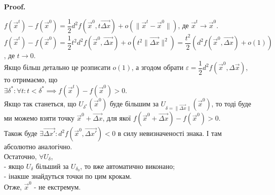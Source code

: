 \documentclass[a4paper, 10pt]{article}
\makeatletter
\def\qed{$\blacksquare$}
\theoremstyle{theoremdd}
\theoremstyle{theoremdd}
\theoremstyle{theoremdd}
\theoremstyle{theoremdd}
\theoremstyle{theoremdd}
\theoremstyle{theoremdd}
\theoremstyle{theoremdd}
\theoremstyle{theoremdd}
\theoremstyle{theoremdd}
\renewenvironment{proof}[1][Proof.\\]{\par
\pushQED{\hfill \qed}%
\normalfont \topsep6\p@\@plus6\p@\relax
\trivlist
\item\relax
{\bfseries
#1\@addpunct{.}}\hspace\labelsep\ignorespaces
}{%
\popQED\endtrivlist\@endpefalse
}
\newcommand\Norm[1]{\lVert#1\rVert}
\makeatother
\begin{document}
\begin{proof}
$f(\vec{x}^t) - f(\vec{x}^0) = \dfrac{1}{2} d^2f (\vec{x}^0, t \vec{\Delta x}) + o(\Norm{\vec{x}^t - \vec{x}^0})$, де $\vec{x}^t \to \vec{x}^0$.\\
$f(\vec{x}^t) - f(\vec{x}^0) = \dfrac{1}{2} t^2 d^2 f(\vec{x}^0, \vec{\Delta x}) + o(t^2 \Norm{\vec{\Delta x}}^2) = \dfrac{t^2}{2} \left(d^2 f(\vec{x}^0, \vec{\Delta x}) + o(1) \right)$, де $t \to 0$.\\
Якщо більш детально це розписати $o(1)$, а згодом обрати $\varepsilon = \dfrac{1}{2}d^2f(\vec{x}^0,\Delta \vec{x})$, то отримаємо, що\\
$\exists \delta^*: \forall t: t < \delta^* \implies f(\vec{x}^t) - f(\vec{x}^0) > 0$.\\
Якщо так станеться, що $U_{\delta^*}(\vec{x}^0)$ буде більшим за $U_{\delta = \Norm{\vec{\Delta x}}}(\vec{x}^0)$, то тоді буде ми можемо взяти точку $\vec{x}^0 + \vec{\Delta x}$, для якої $f(\vec{x}^0 + \vec{\Delta x}) - f(\vec{x}^0) > 0$.\\
Також буде $\exists \vec{\Delta x'}: d^2 f(\vec{x}^0, \vec{\Delta x'}) < 0$ в силу невизначеності знака. І там абсолютно аналогічно.\\
Остаточно, $\forall U_{\delta}$,\\
- якщо $U_{\delta}$ більший за $U_{\delta_0}$, то вже автоматично виконано;\\
- інакше знайдуться точки по цим крокам.\\
Отже, $\vec{x}^0$ - не екстремум.
\end{proof}
\end{document}
